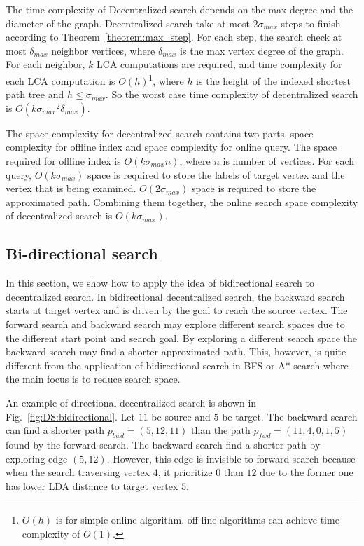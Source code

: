 The time complexity of Decentralized search depends on the max degree and the diameter of the graph. Decentralized search take at most $2{\sigma}_{max}$ steps to finish according to Theorem~\ref{theorem:max_step}. For each step, the search check at most ${\delta}_{max}$ neighbor vertices, where ${\delta}_{max}$ is the max vertex degree of the graph. For each neighbor, $k$ LCA computations are required, and time complexity for each LCA computation is $O(h)$\footnote{$O(h)$ is for simple online algorithm, off-line algorithms can achieve time complexity of $O(1)$.}, where $h$ is the height of the indexed shortest path tree and $h \leq {\sigma}_{max}$. So the worst case time complexity of decentralized search is $O(k{{\sigma}_{max}}^2{\delta}_{max})$.

The space complexity for decentralized search contains two parts, space complexity for offline index and space complexity for online query. The space required for offline index is $O(k{\sigma}_{max}n)$, where $n$ is number of vertices. For each query, $O(k{\sigma}_{max})$ space is required to store the labels of target vertex and the vertex that is being examined. $O(2{\sigma}_{max})$ space is required to store the approximated path. Combining them together, the online search space complexity of decentralized search is $O(k{\sigma}_{max})$. 

\subsection{Bi-directional search}

In this section, we show how to apply the idea of bidirectional search to decentralized search. In bidirectional decentralized search, the backward search starts at target vertex and is driven by the goal to reach the source vertex. The forward search and backward search may explore different search spaces due to the different start point and search goal. By exploring a different search space  the backward search may find a shorter approximated path. This, however, is quite different from the application of bidirectional search in BFS or A* search where the main focus is to reduce search space. 

An example of directional decentralized search is shown in Fig.~\ref{fig:DS:bidirectional}. Let $11$ be source and $5$ be target. The backward search can find a shorter path $p_{bwd} = (5, 12, 11)$ than the path $p_{fwd} = (11, 4, 0, 1, 5)$ found by the forward search. The backward search find a shorter path by exploring edge $(5, 12)$. However, this edge is invisible to forward search because when the search traversing vertex $4$, it prioritize $0$ than $12$ due to the former one has lower LDA distance to target vertex $5$. 

